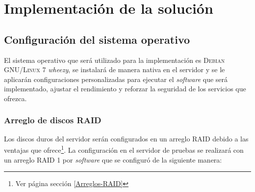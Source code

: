 {
  \linespread{1}
  \cleardoublepage  
  \chapter{Implementaci\'{o}n de la soluci\'{o}n}
  \label{chap:cap3}
}

    \section {Configuraci\'{o}n del sistema operativo}

El sistema operativo que ser\'{a} utilizado para la implementaci\'{o}n es \textsc{Debian GNU/Linux} 7 \guillemotleft\emph{wheezy}\guillemotright, se instalar\'{a} de manera nativa en el servidor y se le aplicar\'{a}n configuraciones personalizadas para ejecutar el \textit{software} que ser\'{a} implementado, ajustar el rendimiento y reforzar la seguridad de los servicios que ofrezca.

      \subsection {Arreglo de discos \textsc{RAID}}

Los discos duros del servidor ser\'{a}n configurados en un arreglo \textsc{RAID} debido a las ventajas que ofrece\footnote{Ver p\'{a}gina \pageref{Arreglos-RAID} secci\'{o}n \ref{Arreglos-RAID}}. La configuraci\'{o}n en el servidor de pruebas se realizar\'{a} con un arreglo \textsc{RAID} 1 por \textit{software} que se configur\'{o} de la siguiente manera: \cite{_softwareraid_????}

